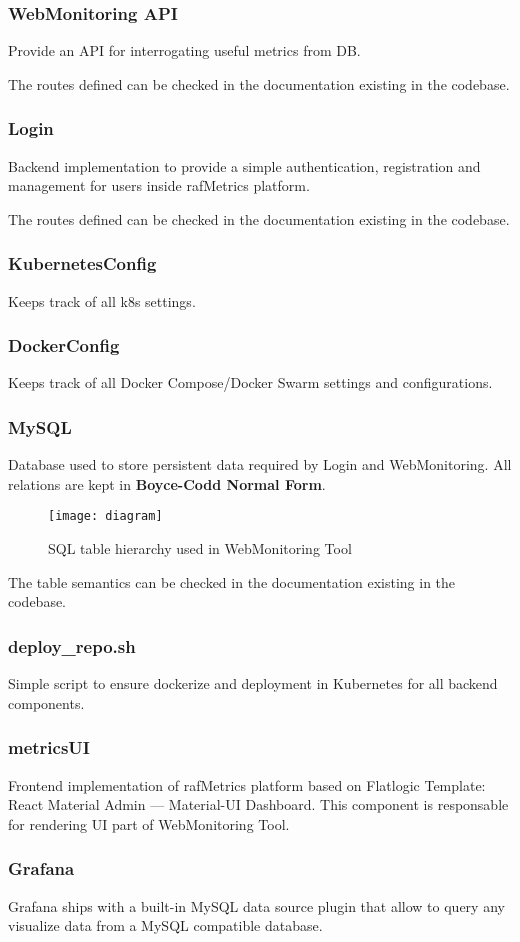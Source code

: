 \subsubsection{WebMonitoring API}
Provide an API for interrogating useful metrics from DB.

The routes defined can be checked in the documentation existing in the codebase.


\subsubsection{Login}
Backend implementation to provide a simple authentication, registration and management for users inside rafMetrics platform.

The routes defined can be checked in the documentation existing in the codebase.


\subsubsection{KubernetesConfig}
Keeps track of all k8s settings.

\subsubsection{DockerConfig}
Keeps track of all Docker Compose/Docker Swarm settings and configurations.

\subsubsection{MySQL}
Database used to store persistent data required by Login and WebMonitoring.
All relations are kept in \textbf{Boyce-Codd Normal Form}.

\begin{figure}[H]
\centering
\texttt{[image: diagram]}
\caption{SQL table hierarchy used in WebMonitoring Tool}
\end{figure}

The table semantics can be checked in the documentation existing in the codebase.


\subsubsection{deploy\_repo.sh}
Simple script to ensure dockerize and deployment in Kubernetes for all backend components.

\subsubsection{metricsUI}
Frontend implementation of rafMetrics platform based on Flatlogic Template: React Material Admin — Material-UI Dashboard. This component is responsable for rendering UI part of WebMonitoring Tool.

\subsubsection{Grafana}
Grafana ships with a built-in MySQL data source plugin that allow to query any visualize data from a MySQL compatible database.
